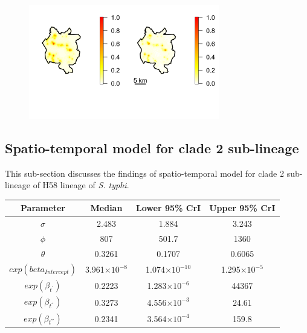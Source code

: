 \documentclass[12pt,a4paper]{report}
\begin{document}
\begin{figure}[H]
\begin{center}
\includegraphics[width = \linewidth, height = 50mm]{Exceedance Probabilities - Major 0.png}
\end{center}
\end{figure}

\subsection{Spatio-temporal model for clade 2 sub-lineage}

This sub-section discusses the findings of spatio-temporal model for clade 2 sub-lineage of H58 lineage of \textit{S. typhi}. 

\begin{table}[h]
    \centering
     
    \begin{tabular}{cccc}
    \toprule
         Parameter & Median & Lower 95\% CrI & Upper 95\% CrI \\ \midrule
        $\sigma$ & 2.483 & 1.884 & 3.243 \\
        $\phi$ & 807 & 501.7 & 1360 \\
        $\theta$ & 0.3261 & 0.1707 & 0.6065 \\
        $exp(beta_{Intercept})$ & 3.961$\times10^{-8}$ & 1.074$\times10^{-10}$ & 1.295$\times10^{-5}$ \\
        $exp(\beta_{t^{'}})$ & 0.2223 & 1.283$\times10^{-6}$ & 44367 \\
        $exp(\beta_{t^{''}})$ & 0.3273 & 4.556$\times10^{-3}$ & 24.61 \\
        $exp(\beta_{t^{'''}})$ & 0.2341 & 3.564$\times10^{-4}$ & 159.8 \\
         \bottomrule
    \end{tabular}
\end{table}
\end{document}
